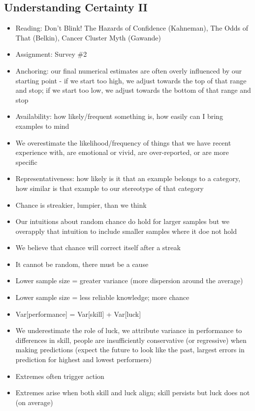 \documentclass[12pt]{article}
\begin{document}
\subsection{Understanding Certainty II}
\begin{itemize}
\item Reading: Don't Blink! The Hazards of Confidence (Kahneman), The Odds of That (Belkin), Cancer Cluster Myth (Gawande)
\item Assignment: Survey \#2
\item Anchoring: our final numerical estimates are often overly influenced by our starting point - if we start too high, we adjust towards the top of that range and stop; if we start too low, we adjust towards the bottom of that range and stop 
\item Availability: how likely/frequent something is, how easily can I bring examples to mind 
\item We overestimate the likelihood/frequency of things that we have recent experience with, are emotional or vivid, are over-reported, or are more specific
\item Representativeness: how likely is it that an example belongs to a category, how similar is that example to our stereotype of that category 
\item Chance is streakier, lumpier, than we think
\item Our intuitions about random chance do hold for larger samples but we overapply that intuition to include smaller samples where it doe not hold 
\item We believe that chance will correct itself after a streak 
\item It cannot be random, there must be a cause 
\item Lower sample size = greater variance (more dispersion around the average) 
\item Lower sample size = less reliable knowledge; more chance 
\item Var[performance] = Var[skill] + Var[luck]
\item We underestimate the role of luck, we attribute variance in performance to differences in skill, people are insufficiently conservative (or regressive) when making predictions (expect the future to look like the past, largest errors in prediction for highest and lowest performers) 
\item Extremes often trigger action 
\item Extremes arise when both skill and luck align; skill persists but luck does not (on average) 

\end{itemize}
\end{document}
